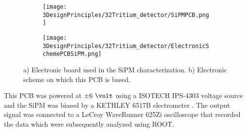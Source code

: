 \begin{figure}
\centering
    \begin{subfigure}[b]{0.8\textwidth}
    \centering
    \texttt{[image: 3DesignPrinciples/32Tritium\_detector/SiPMPCB.png]}  
    \caption{\label{subfig:ElectronicBoardSiPM}}
    \end{subfigure}
    \hfill
    \begin{subfigure}[b]{0.8\textwidth}
    \centering
    \texttt{[image: 3DesignPrinciples/32Tritium\_detector/ElectronicSchemePCBSiPM.png]}  
    \caption{\label{subfig:ElectronicSchemePCBSiPM}}
    \end{subfigure}
    \hfill
 \caption{a) Electronic board used in the SiPM characterization. b) Electronic scheme on which this PCB is based.}
 \label{fig:PCBSiPM}
\end{figure}
This PCB was powered at $\pm6~\volt$ using a ISOTECH IPS-4303 voltage source \cite{VoltageSourceISOTECH} and the SiPM was biased by a KETHLEY 6517B electrometer \cite{VoltageSourceKethley}. The output signal was connected to a LeCroy WaveRunner 625Zi oscilloscope \cite{OscilloscopeIFIMED} that recorded the data which were subsequently analyzed using ROOT.